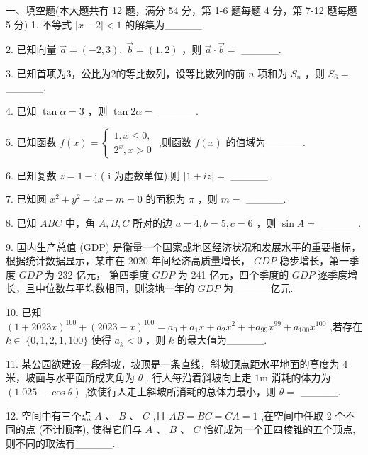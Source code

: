 \documentclass[10pt]{article}
\begin{document}
一、填空题(本大题共有 12 题，满分 54 分，第 1-6 题每题 4 分，第 7-12 题每题 5 分) 1. 不等式 \(\left| {x - 2}\right|  < 1\) 的解集为\_\_\_\_\_.

2. 已知向量 \(\overrightarrow{a} = \left( {-2,3}\right) ,\;\overrightarrow{b} = \left( {1,2}\right)\) ，则 \(\overrightarrow{a} \cdot  \overrightarrow{b} =\) \_\_\_\_\_.

3. 已知首项为3，公比为2的等比数列，设等比数列的前 \(n\) 项和为 \({S}_{n}\) ，则 \({S}_{6} =\) \_\_\_\_\_.

4. 已知 \(\tan \alpha  = 3\) ，则 \(\tan {2\alpha } =\) \_\_\_\_\_.

5. 已知函数 \(f\left( x\right)  = \left\{  \begin{array}{l} 1,x \leq  0, \\  {2}^{x},x > 0 \end{array}\right.\) ,则函数 \(f\left( x\right)\) 的值域为\_\_\_\_\_.

6. 已知复数 \(z = 1 - \mathrm{i}\) ( \(\mathrm{i}\) 为虚数单位),则 \(\left| {1 + {iz}}\right|  =\) \_\_\_\_\_.

7. 已知圆 \({x}^{2} + {y}^{2} - {4x} - m = 0\) 的面积为 \(\pi\) ，则 \(m =\) \_\_\_\_\_.

8. 已知 \({ABC}\) 中，角 \(A,B,C\) 所对的边 \(a = 4,b = 5,c = 6\) ，则 \(\sin A =\) \_\_\_\_\_.

9. 国内生产总值 (GDP) 是衡量一个国家或地区经济状况和发展水平的重要指标，根据统计数据显示，某市在 2020 年间经济高质量增长， \({GDP}\) 稳步增长，第一季度 \({GDP}\) 为 232 亿元， 第四季度 \({GDP}\) 为 241 亿元，四个季度的 \({GDP}\) 逐季度增长，且中位数与平均数相同，则该地一年的 \({GDP}\) 为\_\_\_\_\_亿元.

10. 已知 \({\left( 1 + {2023}x\right) }^{100} + {\left( {2023} - x\right) }^{100} = {a}_{0} + {a}_{1}x + {a}_{2}{x}^{2} +  + {a}_{99}{x}^{99} + {a}_{100}{x}^{100}\) ,若存在 \(k \in \; \{ 0,1,2,1,{100}\}\) 使得 \({a}_{k} < 0\) ，则 \(k\) 的最大值为\_\_\_\_\_.

11. 某公园欲建设一段斜坡，坡顶是一条直线，斜坡顶点距水平地面的高度为 4 米，坡面与水平面所成夹角为 \(\theta\) . 行人每沿着斜坡向上走 \(1\mathrm{m}\) 消耗的体力为 \(\left( {{1.025} - \cos \theta }\right)\) ,欲使行人走上斜坡所消耗的总体力最小，则 \(\theta  =\) \_\_\_\_\_.

12. 空间中有三个点 \(A\text{ 、 }B\text{ 、 }C\) ,且 \({AB} = {BC} = {CA} = 1\) ,在空间中任取 2 个不同的点 (不计顺序), 使得它们与 \(A\) 、 \(B\) 、 \(C\) 恰好成为一个正四棱锥的五个顶点, 则不同的取法有\_\_\_\_\_.
\end{document}
